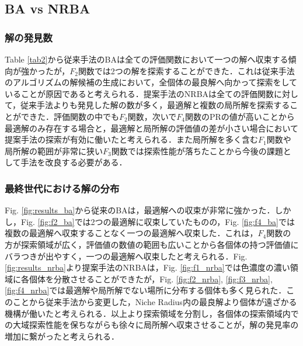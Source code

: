 \documentclass{jarticle}
\begin{document}
\subsection{BA vs NRBA}
\subsubsection{解の発見数}
Table \ref{tab2}から従来手法のBAは全ての評価関数において一つの解へ収束する傾向が強かったが，$F_2$関数では2つの解を探索することができた．これは従来手法のアルゴリズムの解候補の生成において，全個体の最良解へ向かって探索をしていることが原因であると考えられる．提案手法のNRBAは全ての評価関数に対して，従来手法よりも発見した解の数が多く，最適解と複数の局所解を探索することができた．評価関数の中でも$F_2$関数，次いで$F_4$関数のPRの値が高いことから最適解のみ存在する場合と，最適解と局所解の評価値の差が小さい場合において提案手法の探索が有効に働いたと考えられる．また局所解を多く含む$F_1$関数や局所解の範囲が非常に狭い$F_3$関数では探索性能が落ちたことから今後の課題として手法を改良する必要がある．

\subsubsection{最終世代における解の分布}
Fig. \ref{fig:results_ba}から従来のBAは，最適解への収束が非常に強かった．しかし，Fig. \ref{fig:f2_ba}では2つの最適解に収束していたものの，Fig. \ref{fig:f4_ba}では複数の最適解へ収束することなく一つの最適解へ収束した．これは，$F_4$関数の方が探索領域が広く，評価値の数値の範囲も広いことから各個体の持つ評価値にバラつきが出やすく，一つの最適解へ収束したと考えられる．Fig. \ref{fig:results_nrba}より提案手法のNRBAは，Fig. \ref{fig:f1_nrba}では色濃度の濃い領域に各個体を分散させることができたが，Fig. \ref{fig:f2_nrba}, \ref{fig:f3_nrba}, \ref{fig:f4_nrba}では最適解や局所解でない場所に分布する個体も多く見られた．このことから従来手法から変更した，Niche Radius内の最良解より個体が遠ざかる機構が働いたと考えられる．以上より探索領域を分割し，各個体の探索領域内での大域探索性能を保ちながらも徐々に局所解へ収束させることが，解の発見率の増加に繋がったと考えられる．
\end{document}
